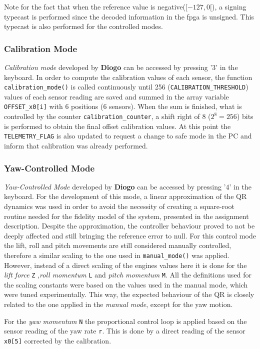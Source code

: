 \documentclass{article}
\begin{document}
Note for the fact that when the reference value is negative($[-127,0[$), a signing typecast is performed since the decoded information in the fpga is unsigned. This typecast is also performed for the controlled modes.

\subsubsection{Calibration Mode}
\textit{Calibration mode} developed by \textbf{Diogo} can be accessed by pressing '$3$' in the keyboard. In order to compute the calibration values of each sensor, the function \texttt{calibration\_mode()} is called continuously until 256 (\texttt{CALIBRATION\_THRESHOLD}) values of each sensor reading are saved and summed in the array variable \texttt{OFFSET\_x0[i]} with 6 positions (6 sensors). When the sum is finished, what is controlled by the counter \texttt{calibration\_counter}, a shift right of $8$ ($2^8=256$) bits is performed to obtain the final offset calibration values. At this point the \texttt{TELEMETRY\_FLAG} is also updated to request a change to safe mode in the PC and inform that calibration was already performed.
\subsubsection{Yaw-Controlled Mode}
\textit{Yaw-Controlled Mode} developed by \textbf{Diogo} can be accessed by pressing '$4$' in the keyboard. For the development of this mode, a linear approximation of the QR dynamics was used in order to avoid the necessity of creating a square-root routine needed for the fidelity model of the system, presented in the assignment description. Despite the approximation, the controller behaviour proved to not be deeply affected and still bringing the reference error to null.
For this control mode the lift, roll and pitch movements are still considered manually controlled, therefore a similar scaling to the one used in \texttt{manual\_mode()} was applied. However, instead of a direct scaling of the engines values here it is done for the \textit{lift force} \texttt{Z} ,\textit{roll momentum} \texttt{L} and \textit{pitch momentum} \texttt{M}. All the definitions used for the scaling constants were based on the values used in the manual mode, which were tuned experimentally. This way, the expected behaviour of the QR is closely related to the one applied in the \textit{manual mode}, except for the yaw motion.

For the \textit{yaw momentum} \texttt{N} the proportional control loop is applied based on the sensor reading of the yaw rate \texttt{r}. This is done by a direct reading of the sensor \texttt{x0[5]} corrected by the calibration. 
\end{document}
